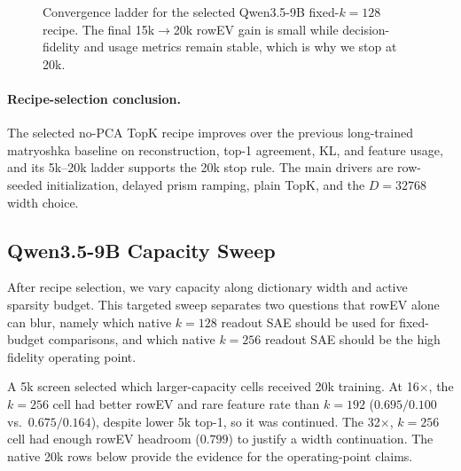 \begin{figure}[!tbp]
    \centering
    \caption{
        Convergence ladder for the selected Qwen3.5-9B fixed-$k=128$ recipe.
        The final 15k$\rightarrow$20k rowEV gain is small while
        decision-fidelity and usage metrics remain stable, which is why we
        stop at 20k.
    }
    \label{fig:app-k-qwen-convergence-ladder}
\end{figure}

\paragraph{Recipe-selection conclusion.}
The selected no-PCA TopK recipe improves over the previous long-trained
matryoshka baseline on reconstruction, top-1 agreement, KL, and feature
usage, and its 5k--20k ladder supports the 20k stop rule. The main drivers are
row-seeded initialization, delayed prism ramping, plain TopK, and the
$D=32768$ width choice.

\ReadoutSAEFloatBarrier
\subsection{Qwen3.5-9B Capacity Sweep}
\label{app:readout-factorizer-qwen-capacity}

After recipe selection, we vary capacity along dictionary width and active
sparsity budget. This targeted sweep separates two questions that rowEV alone
can blur, namely which native $k=128$ readout SAE should be used for fixed-budget
comparisons, and which native $k=256$ readout SAE should be the
high fidelity operating point.

A 5k screen selected which larger-capacity cells received 20k training. At
16$\times$, the $k=256$ cell had better rowEV and rare feature
rate than $k=192$ ($0.695/0.100$ vs.\ $0.675/0.164$), despite lower 5k top-1,
so it was continued. The 32$\times$, $k=256$ cell had enough rowEV headroom
($0.799$) to justify a width continuation. The native 20k rows below provide
the evidence for the operating-point claims.

